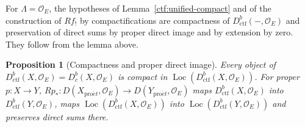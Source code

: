 \documentclass[11pt,a4paper]{article}
\numberwithin{equation}{section}
\newtheorem{proposition}[theorem]{Proposition}
\theoremstyle{definition}
\theoremstyle{remark}
\newcommand{\Dbc}{D^b_c}
\newcommand{\Loc}{\operatorname{Loc}}
\newcommand{\proet}{\mathrm{pro}\acute{e}t}
\newcommand{\Dctf}{D^b_{\mathrm{ctf}}}
\begin{document}
For $\Lambda=\mathcal O_E$, the hypotheses of
Lemma~\ref{ctf:unified-compact} and of the construction of $Rf_!$ by
compactifications are compactness of $\Dctf(-,\mathcal O_E)$ and
preservation of direct sums by proper direct image and by extension by
zero. They follow from the lemma above.

\begin{proposition}[Compactness and proper direct image]
\label{i:compactness}
Every object of $\Dctf(X,\mathcal O_E)=\Dbc(X,\mathcal O_E)$
is compact in $\Loc(\Dctf(X,\mathcal O_E))$. For proper $p:X\to Y$,
$Rp_*\colon D(X_{\proet},\mathcal O_E)\to D(Y_{\proet},\mathcal O_E)$ maps $\Dctf(X,\mathcal O_E)$ into
$\Dctf(Y,\mathcal O_E)$, maps $\Loc(\Dctf(X,\mathcal O_E))$
into $\Loc(\Dctf(Y,\mathcal O_E))$ and preserves direct sums there.
\end{proposition}
\end{document}
